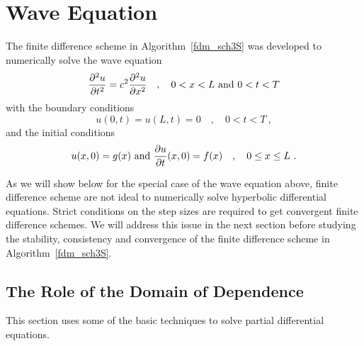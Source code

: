 \section{Wave Equation}

The finite difference scheme in Algorithm~\ref{fdm_sch3S} was
developed to numerically solve the wave equation
\begin{equation} \label{waveLT1}
  \frac{\partial^{2}{u}}{\partial{t}^{2}} = c^2 \frac{\partial^{2}{u}}{\partial{x}^{2}} \quad , \quad
  0 < x < L \ \text{and} \ 0<t<T
\end{equation}
with the boundary conditions
\begin{equation} \label{waveLT2}
u(0,t)=u(L,t)=0 \quad , \quad 0<t<T \ ,
\end{equation}
and the initial conditions
\begin{equation} \label{waveLT3}
u(x,0) = g(x) \ \text{and} \ \frac{\partial{u}}{\partial{t}}(x,0) = f(x) \quad , \quad
 0 \leq x \leq L \ .
\end{equation}

As we will show below for the special case of the wave equation
above, finite difference scheme are not ideal to numerically solve
hyperbolic differential equations.  Strict conditions on the step sizes
are required to get convergent finite difference schemes.  We will
address this issue in the next section before studying the stability,
consistency and convergence of the finite difference scheme in
Algorithm~\ref{fdm_sch3S}.

\subsection{The Role of the Domain of Dependence} \label{DomDepHyp}

This section uses some of the basic techniques to solve partial
differential equations.

